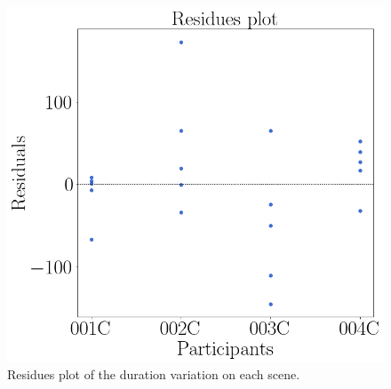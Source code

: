 \begin{figure}[!htb]
\begin{minipage}{0.45\linewidth}
            \includegraphics[width = \linewidth]{Resultados/Tempo/Figuras/png/residplot_duration_var.png}
            \caption{Residues plot of the duration variation on each scene.}
            \label{fig:residual_duration_average}
        \end{minipage}
    \end{figure}

\FloatBarrier
